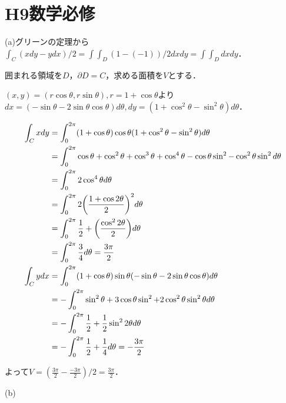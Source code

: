 \documentclass[
		book,
		head_space=20mm,
		foot_space=20mm,
		gutter=10mm,
		line_length=190mm
]{jlreq}
\begin{document}
\section{H9数学必修}



(a)グリーンの定理から$\int_C (xdy-ydx)/2=\int\int_D (1-(-1))/2dxdy=\int\int_D dxdy$．

囲まれる領域を$D$，$\partial D=C$，求める面積を$V$とする．

$(x,y)=(r\cos\theta,r\sin\theta),r=1+\cos \theta$より
$dx=(-\sin \theta-2\sin\theta \cos\theta) d\theta,dy=(1+\cos^2 \theta-\sin^2 \theta) d\theta$．


\begin{align}
    \int_C xdy&=\int_0^{2\pi} (1+\cos \theta)\cos\theta(1+\cos^2 \theta-\sin^2 \theta) d\theta\\
    &=\int_0^{2\pi} \cos\theta+\cos^2 \theta+\cos^3 \theta+\cos^4 \theta-\cos\theta\sin^2 -\cos^2\theta\sin^2 d\theta\\
    &=\int_0^{2\pi}2\cos^4 \theta d\theta \\
    &=\int_0^{2\pi}2\qty(\frac{1+\cos 2\theta}{2})^2 d\theta \\
    &=\int_0^{2\pi}\frac{1}{2}+\qty(\frac{\cos^2 2\theta}{2}) d\theta \\
    &=\int_0^{2\pi}\frac{3}{4}d\theta=\frac{3\pi}{2} \\
    \int_C ydx&=\int_0^{2\pi} (1+\cos \theta)\sin\theta(-\sin \theta-2\sin\theta \cos\theta) d\theta \\
    &=-\int_0^{2\pi} \sin^2 \theta+3\cos\theta\sin^2 + 2\cos^2\theta\sin^2 \theta d\theta \\
    &=-\int_0^{2\pi} \frac{1}{2}+\frac{1}{2}\sin^2 2\theta d\theta \\
    &=-\int_0^{2\pi} \frac{1}{2}+\frac{1}{4}d\theta=-\frac{3\pi}{2} \\
\end{align}

よって$V=(\frac{3\pi}{2}-\frac{-3\pi}{2})/2=\frac{3\pi}{2}$．

(b)
\end{document}
